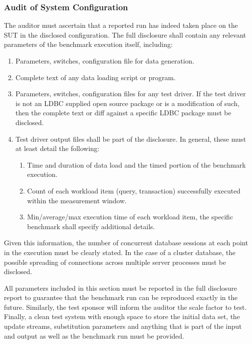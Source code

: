 \subsubsection{Audit of System Configuration}
The auditor must ascertain that a reported run has indeed taken place on the SUT in the disclosed configuration.
The full disclosure shall contain any relevant parameters of the benchmark execution itself, including:
\begin{enumerate}
    \item Parameters, switches, configuration file for data generation.
    \item Complete text of any data loading script or program.
    \item Parameters, switches, configuration files for any test driver. If the test driver is not an LDBC supplied open source package or is a modification of such, then the complete text or diff against a specific LDBC package must be disclosed.
    \item Test driver output files shall be part of the disclosure. In general, these must at least detail the following:
    \begin{enumerate}[label=\roman*)]
        \item Time and duration of data load and the timed portion of the benchmark execution.
        \item Count of each workload item (\eg query, transaction) successfully executed within the measurement window.
        \item Min/average/max execution time of each workload item, the specific benchmark shall specify additional details.
    \end{enumerate}
\end{enumerate}

Given this information, the number of concurrent database sessions at each point in the execution must be clearly stated. In the case of a cluster database, the possible spreading of connections across multiple server processes must be disclosed.


All parameters included in this section must be reported in the full disclosure report to guarantee that the benchmark run can be reproduced exactly in the future. Similarly, the test sponsor will inform the auditor the scale factor to test. Finally, a clean test system with enough space to store the initial data set, the update streams, substitution parameters and anything that is part of the input and output as well as the benchmark run must be provided.

